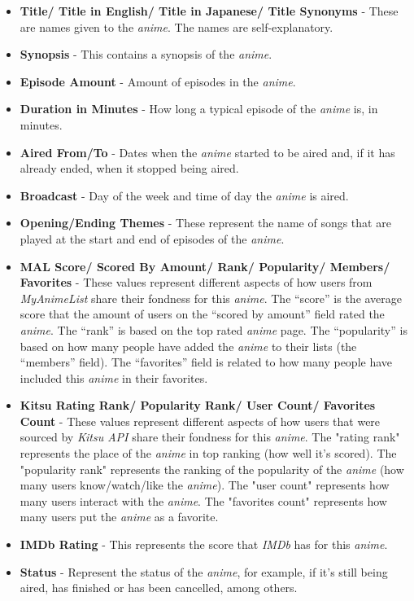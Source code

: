 \documentclass[twocolumn,twoside,11pt,a4paper]{article}
\begin{document}
\begin{itemize}
\item \textbf{Title/ Title in English/ Title in Japanese/ Title Synonyms} - These are names given to the \textit{anime}. The names are self-explanatory.
\item \textbf{Synopsis} - This contains a synopsis of the \textit{anime}.
\item \textbf{Episode Amount} - Amount of episodes in the \textit{anime}.
\item \textbf{Duration in Minutes} - How long a typical episode of the \textit{anime} is, in minutes.
\item \textbf{Aired From/To} - Dates when the \textit{anime} started to be aired and, if it has already ended, when it stopped being aired.
\item \textbf{Broadcast}  - Day of the week and time of day the \textit{anime} is aired.
\item \textbf{Opening/Ending Themes} - These represent the name of songs that are played at the start and end of episodes of the \textit{anime}.
\item \textbf{MAL Score/ Scored By Amount/ Rank/ Popularity/ Members/ Favorites} - These values represent different aspects of how users from \textit{MyAnimeList} share their fondness for this \textit{anime}. The “score” is the average score that the amount of users on the “scored by amount” field rated the \textit{anime}. The “rank” is based on the top rated \textit{anime} page. The “popularity” is based on how many people have added the \textit{anime} to their lists (the “members” field). The “favorites” field is related to how many people have included this \textit{anime} in their favorites.
\item \textbf{Kitsu Rating Rank/ Popularity Rank/ User Count/ Favorites Count} -  These values represent different aspects of how users that were sourced by \textit{Kitsu API} share their fondness for this \textit{anime}. The "rating rank" represents the place of the \textit{anime} in top ranking (how well it's scored). The "popularity rank" represents the ranking of the popularity of the \textit{anime} (how many users know/watch/like the \textit{anime}). The "user count" represents how many users interact with the \textit{anime}. The "favorites count" represents how many users put the \textit{anime} as a favorite.
\item \textbf{IMDb Rating} - This represents the score that \textit{IMDb} has for this \textit{anime}.
\item \textbf{Status} - Represent the status of the \textit{anime}, for example, if it's still being aired, has finished or has been cancelled, among others.

\end{itemize}
\end{document}
